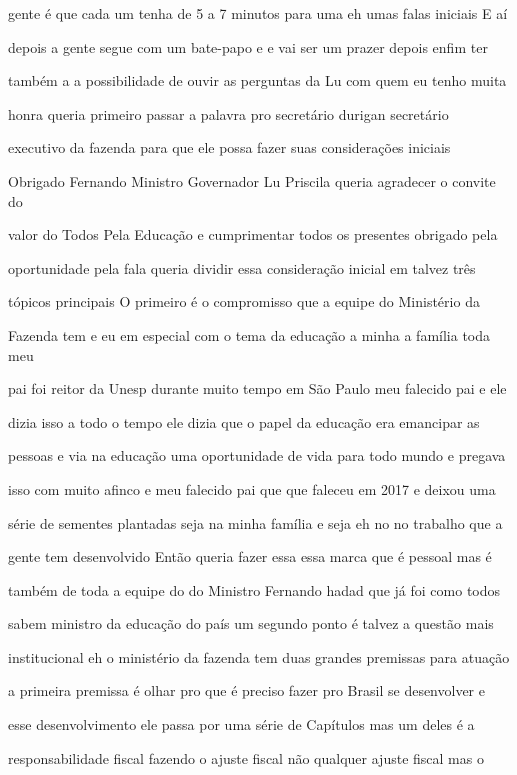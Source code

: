 \documentclass[a4paper,12pt]{article}
\begin{document}
gente é que cada um tenha de 5 a 7 minutos para uma eh umas falas iniciais E aí

depois a gente segue com um bate-papo e e vai ser um prazer depois enfim ter

também a a possibilidade de ouvir as perguntas da Lu com quem eu tenho muita

honra queria primeiro passar a palavra pro secretário durigan secretário

executivo da fazenda para que ele possa fazer suas considerações iniciais

Obrigado Fernando Ministro Governador Lu Priscila queria agradecer o convite do

valor do Todos Pela Educação e cumprimentar todos os presentes obrigado pela

oportunidade pela fala queria dividir essa consideração inicial em talvez três

tópicos principais O primeiro é o compromisso que a equipe do Ministério da

Fazenda tem e eu em especial com o tema da educação a minha a família toda meu

pai foi reitor da Unesp durante muito tempo em São Paulo meu falecido pai e ele

dizia isso a todo o tempo ele dizia que o papel da educação era emancipar as

pessoas e via na educação uma oportunidade de vida para todo mundo e pregava

isso com muito afinco e meu falecido pai que que faleceu em 2017 e deixou uma

série de sementes plantadas seja na minha família e seja eh no no trabalho que a

gente tem desenvolvido Então queria fazer essa essa marca que é pessoal mas é

também de toda a equipe do do Ministro Fernando hadad que já foi como todos

sabem ministro da educação do país um segundo ponto é talvez a questão mais

institucional eh o ministério da fazenda tem duas grandes premissas para atuação

a primeira premissa é olhar pro que é preciso fazer pro Brasil se desenvolver e

esse desenvolvimento ele passa por uma série de Capítulos mas um deles é a

responsabilidade fiscal fazendo o ajuste fiscal não qualquer ajuste fiscal mas o
\end{document}
